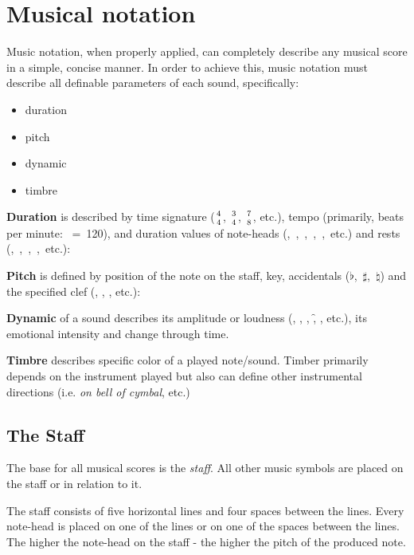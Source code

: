 \chapter{Musical notation}\label{ch:music_notation}

Music notation, when properly applied, can completely describe any musical score in a simple, concise manner. In order
to achieve this, music notation must describe all definable parameters of each sound, specifically\cite{mcgrain1990music}:

\begin{itemize}
	\item duration
	\item pitch
	\item dynamic
	\item timbre
\end{itemize}

\textbf{Duration} is described by time signature ($4\atop4$, $3\atop4$, $7\atop8$, etc.), tempo (primarily, beats per
minute: \Vier~=~120), and duration values of note-heads (\Ganz,~\Halb,~\Vier,~\AAcht,~\Sech,~etc.) and rests
(\GaPa,~\ViPa,~\AcPa,~\SePa,~etc.):

\figcenter{}


\textbf{Pitch} is defined by position of the note on the staff, key, accidentals ($\flat$,~$\sharp$,~$\natural$) and
the specified clef (\inlinemusic\smalltrebleclef, \inlinemusic\smallbassclef, \inlinemusic\smallaltoclef, etc.):

\figcenter{}


\textbf{Dynamic} of a sound describes its amplitude or loudness (\pp, \p, \mf, \f, \ff, etc.), its emotional intensity
and change through time.

\textbf{Timbre} describes specific color of a played note/sound. Timber primarily depends on the instrument played but
also can define other instrumental directions (i.e. \textit{on bell of cymbal}, etc.)


\section{The Staff}\label{sec:the_staff}
The base for all musical scores is the \textit{staff}. All other music symbols are placed on the staff or in relation
to it.

The staff consists of five horizontal lines and four spaces between the lines. Every note-head is placed on one of
the lines or on one of the spaces between the lines. The higher the note-head on the staff - the higher the pitch of
the produced note.

